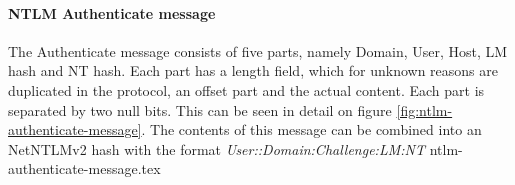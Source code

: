 \documentclass{article}
\begin{document}
\paragraph{NTLM Authenticate message}
The Authenticate message consists of five parts, namely Domain, User, Host, LM hash and NT hash. Each part has a length field, which for unknown reasons are duplicated in the protocol, an offset part and the actual content. Each part is separated by two null bits. This can be seen in detail on figure \ref{fig:ntlm-authenticate-message}. The contents of this message can be combined into an NetNTLMv2 hash with the format \emph{User::Domain:Challenge:LM:NT}
{ntlm-authenticate-message.tex}
\end{document}
